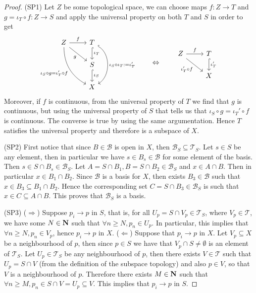 \begin{proof}
  (SP1) Let \(Z\) be some topological space, we can choose maps \(f: Z \to T\)
  and \(g = \iota_T \circ f : Z \to S\) and apply the universal property on both
  \(T\) and \(S\) in order to get
  \[
    \begin{tikzcd}
      Z \ar[r,"f"]
      \ar[rd, swap, "g"]
      \ar[rdd, swap, bend right,
      "\iota_S \circ g = \iota_T' \circ f"]
        &T \ar[d, hook, "\iota_T"]
        \ar[dd, hook, bend left = 60, "\iota_S \circ \iota_T := \iota_T'"]\\
        &S \ar[d, hook, "\iota_S"] \\
        &X
    \end{tikzcd}
    \qquad \Leftrightarrow \qquad
    \begin{tikzcd}
      Z \ar[dr, swap, "\iota_T' \circ f"] \ar[r, "f"]
        &T \ar[d, hook, "\iota_T'"] \\
        &X
    \end{tikzcd}
  \]
  Moreover, if \(f\) is continuous, from the universal property of \(T\) we find
  that \(g\) is continuous, but using the universal property of \(S\) that tells
  us that \(\iota_S \circ g = \iota_T' \circ f\) is continuous. The converse is
  true by using the same argumentation. Hence \(T\) satisfies the universal
  property and therefore is a subspace of \(X\).

  (SP2) First notice that since \(B \in \mathcal B\) is open in \(X\), then
  \(\mathcal B_S \subseteq \mathcal T_S\). Let \(s \in S\) be any element, then
  in particular we have \(s \in B_s \in \mathcal B\) for some element of the
  basis. Then \(s \in S \cap B_s \in \mathcal B_S\). Let \(A = S \cap B_1, B = S
  \cap B_2 \in \mathcal B_S\) and \(x \in A \cap B\). Then in particular \(x \in
  B_1 \cap B_2\). Since \(\mathcal B\) is a basis for \(X\), then exists \(B_3
  \in \mathcal B\) such that \(x \in B_3 \subseteq B_1 \cap B_2\). Hence the
  corresponding set \(C = S \cap B_3 \in \mathcal B_S\) is such that \(x \in C
  \subseteq A \cap B\). This proves that \(\mathcal B_S\) is a basis.

  (SP3) (\(\Rightarrow\)) Suppose \(p_i \to p\) in \(S\), that is, for all \(U_p
  = S \cap V_p \in \mathcal T_S\), where \(V_p \in \mathcal T\), we have some
  \(N \in \mathbf{N}\) such that \(\forall n \geq N, p_n \in U_p\). In
  particular, this implies that \(\forall n \geq N, p_n \in V_p\), hence \(p_i
  \to p\) in \(X\).
  (\(\Leftarrow\)) Suppose that \(p_i \to p\) in \(X\). Let \(V_p \subseteq X\)
  be a neighbourhood of \(p\), then since \(p \in S\) we have that \(V_p \cap S
  \neq \emptyset\) is an element of \(\mathcal T_S\). Let \(U_p \in
  \mathcal T_S\) be any neighbourhood of \(p\), then there exists \(V \in
  \mathcal T\) such that \(U_p = S \cap V\) (from the definition of the subspace
  topology) and also \(p \in V\), so that \(V\) is a neighbourhood of \(p\).
  Therefore there exists \(M \in \mathbf{N}\) such that \(\forall n \geq M, p_n
  \in S \cap V = U_p \subseteq V\). This implies that \(p_i \to p\) in \(S\).


\end{proof}

